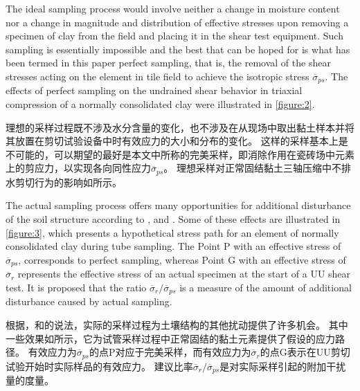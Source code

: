 


\begin{paracol}{2}
    
    The ideal sampling process would involve neither a change in moisture content nor a change in magnitude and distribution of effective stresses upon removing a specimen of clay from the field and placing it in the shear test equipment. Such sampling is essentially impossible and the best that can be hoped for is what has been termed in this paper perfect sampling, that is, the removal of the shear stresses acting on the element in tile field to achieve the isotropic stress $\overline{\sigma}_{ps}$. The effects of perfect sampling on the undrained shear behavior in triaxial compression of a normally consolidated clay were illustrated in \autoref{figure:2}.

    \switchcolumn

    理想的采样过程既不涉及水分含量的变化，也不涉及在从现场中取出黏土样本并将其放置在剪切试验设备中时有效应力的大小和分布的变化。 这样的采样基本上是不可能的，可以期望的最好是本文中所称的完美采样，即消除作用在瓷砖场中元素上的剪应力，以实现各向同性应力$\overline{\sigma}_{ps}$。 理想采样对正常固结黏土三轴压缩中不排水剪切行为的影响如所示。

    \switchcolumn*

    The actual sampling process offers many opportunities for additional disturbance of the soil structure according to \citet{Rutledge19441155}, \citet{Hansen1948189} and \citet{Hvorslev1949}. Some of these effects are illustrated in \autoref{figure:3}, which presents a hypothetical stress path for an element of normally consolidated clay during tube sampling. The Point P with an effective stress of $\overline{\sigma}_{ps}$, corresponds to perfect sampling, whereas Point G with an effective stress of $\overline{\sigma}_r$ represents the effective stress of an actual specimen at the start of a UU shear test. It is proposed that the ratio $\overline{\sigma}_r/\overline{\sigma}_{ps}$ is a measure of the amount of additional disturbance caused by actual sampling.

    \switchcolumn
   
    根据\citet{Rutledge19441155}，\citet{Hansen1948189}和\citet{Hvorslev1949}的说法，实际的采样过程为土壤结构的其他扰动提供了许多机会。 其中一些效果如所示，它为试管采样过程中正常固结的黏土元素提供了假设的应力路径。 有效应力为$\overline{\sigma}_{ps}$的点P对应于完美采样，而有效应力为$\overline{\sigma}_r$的点G表示在UU剪切试验开始时实际样品的有效应力。 建议比率$\overline{\sigma}_r/\overline{\sigma}_{ps}$是对实际采样引起的附加干扰量的度量。

\end{paracol}

